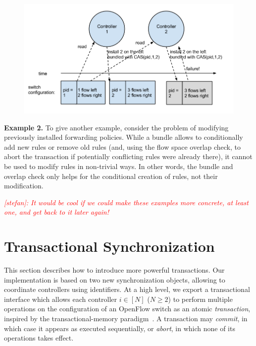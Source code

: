 \documentclass[conference]{sigcomm-alternate}
\newcommand{\stefan}[1]{\textit{\textcolor{red}{[stefan]: #1}}} %
\begin{document}
\begin{figure}[ht]
\centering
\includegraphics[width=1\columnwidth]{sync-with-cas.png}\\
\caption{}\label{fig:cas-sync}
\end{figure}

\textbf{Example 2.} To give another example,
consider the problem of modifying previously
installed forwarding policies.
While a bundle allows to conditionally add new rules or remove
old rules (and, using the flow space overlap
check, to abort the transaction if potentially conflicting
rules were already there), it cannot be used
to modify rules in non-trivial ways.
In other words, the bundle and overlap check only helps
for the conditional creation of rules, not their modification.

\stefan{It would be cool if we could make these examples more concrete,
at least one, and get back to it later again!}

\section{Transactional Synchronization}\label{sec:main}

This section describes how to introduce more powerful transactions.
Our implementation is based on two new synchronization objects,
allowing to coordinate controllers using identifiers.
At a high level, we export a
transactional interface which allows each controller $i\in[N]$ ($N\geq
2$) to perform multiple
operations on the configuration of an OpenFlow switch as an atomic
\emph{transaction}, inspired by the transactional-memory paradigm~\cite{stm-st95,tm-book}. A transaction may \emph{commit}, in
which case it appears as executed sequentially, or \emph{abort}, in
which none of its operations takes effect.
\end{document}
